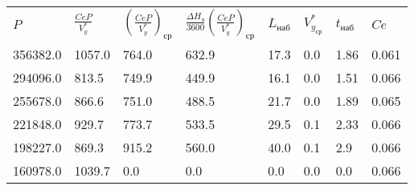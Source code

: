 \begin{tabular}{llllllll}
$P$ & $\frac{CeP}{V_y^*}$ & $(\frac{CeP}{V_y^*})_{ср}$ & $\frac{\Delta H_э}{3600}(\frac{CeP}{V_y^*})_{ср}$ & $L_{наб}$ & $V_{y_{ср}}^*$ & $t_{наб}$ & $Ce$ \\
356382.0 & 1057.0 & 764.0 & 632.9 & 17.3 & 0.0 & 1.86 & 0.061 \\
294096.0 & 813.5 & 749.9 & 449.9 & 16.1 & 0.0 & 1.51 & 0.066 \\
255678.0 & 866.6 & 751.0 & 488.5 & 21.7 & 0.0 & 1.89 & 0.065 \\
221848.0 & 929.7 & 773.7 & 533.5 & 29.5 & 0.1 & 2.33 & 0.066 \\
198227.0 & 869.3 & 915.2 & 560.0 & 40.0 & 0.1 & 2.9 & 0.066 \\
160978.0 & 1039.7 & 0.0 & 0.0 & 0.0 & 0.0 & 0.0 & 0.066 \\
\end{tabular}
